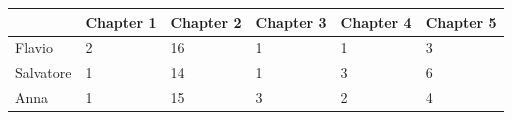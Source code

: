 \begin{table}[H]
\centering
\begin{tabular}{|l|p{2.5cm}|p{2.5cm}|p{2.5cm}|p{2.5cm}|p{2.5cm}|}
\hline
          & Chapter 1 & Chapter 2 & Chapter 3 & Chapter 4 & Chapter 5 \\ \hline
Flavio    &         2 &    16      &          1 &   1 &     3   \\ \hline
Salvatore &         1 &       14    &          1 &     3 &    6  \\ \hline
Anna      &         1 &        15   &          3 &     2  &   4  \\ \hline
\end{tabular}
\end{table}